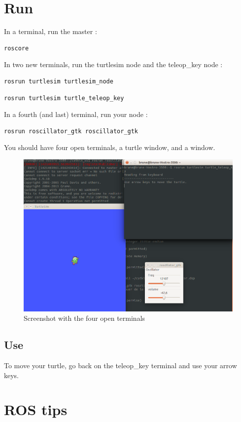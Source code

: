 \section{Run}
In a terminal, run the master : 
\begin{lstlisting}
roscore
\end{lstlisting}
In two new terminals, run the turtlesim node and the teleop\_key node :
\begin{lstlisting}
rosrun turtlesim turtlesim_node
\end{lstlisting}
\begin{lstlisting}
rosrun turtlesim turtle_teleop_key
\end{lstlisting}
In a fourth (and last) terminal, run your \faust node :
\begin{lstlisting}
rosrun roscillator_gtk roscillator_gtk
\end{lstlisting}
You should have four open terminals, a turtle window, and a \faust window.

\begin{figure}[ht!]
\centering
\includegraphics[scale=0.2]{images/tutocommandline.png}
\caption{Screenshot with the four open terminals}
\label{fig:screenshot}
\end{figure}

\subsection{Use}
To move your turtle, go back on the teleop\_key terminal and use your arrow keys.

\newpage

\section{ROS tips}
\label{sec:rostips}

